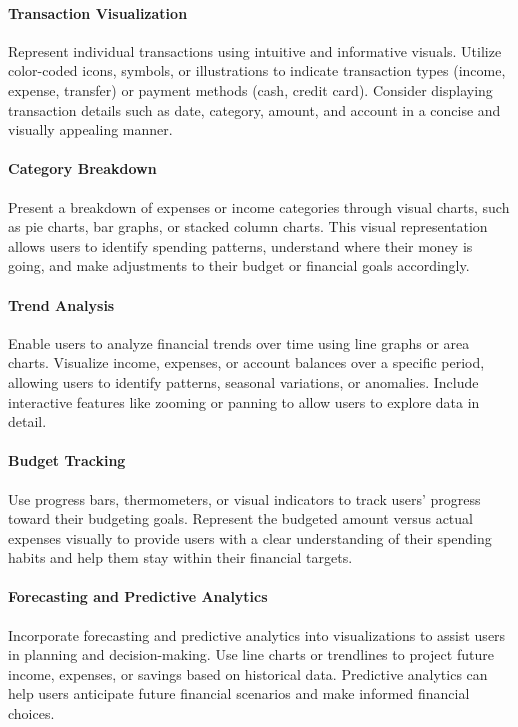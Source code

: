 \paragraph{Transaction Visualization}
Represent individual transactions using intuitive and informative visuals. Utilize color-coded icons, symbols, or 
illustrations to indicate transaction types (income, expense, transfer) or payment methods (cash, credit card). 
Consider displaying transaction details such as date, category, amount, and account in a concise and visually 
appealing manner.

\paragraph{Category Breakdown}
Present a breakdown of expenses or income categories through visual charts, such as pie charts, bar graphs, or 
stacked column charts. This visual representation allows users to identify spending patterns, understand where 
their money is going, and make adjustments to their budget or financial goals accordingly.

\paragraph{Trend Analysis}
Enable users to analyze financial trends over time using line graphs or area charts. Visualize income, expenses, or 
account balances over a specific period, allowing users to identify patterns, seasonal variations, or anomalies. 
Include interactive features like zooming or panning to allow users to explore data in detail.

\paragraph{Budget Tracking}
Use progress bars, thermometers, or visual indicators to track users' progress toward their budgeting goals. Represent 
the budgeted amount versus actual expenses visually to provide users with a clear understanding of their spending 
habits and help them stay within their financial targets.

\paragraph{Forecasting and Predictive Analytics}
Incorporate forecasting and predictive analytics into visualizations to assist users in planning and decision-making.
Use line charts or trendlines to project future income, expenses, or savings based on historical data. Predictive 
analytics can help users anticipate future financial scenarios and make informed financial choices.

